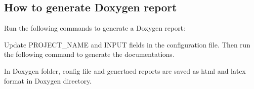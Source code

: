 \subsection*{How to generate Doxygen report}

Run the following commands to generate a Doxygen report\+: 
\begin{DoxyCode}{0}
\end{DoxyCode}
 Update P\+R\+O\+J\+E\+C\+T\+\_\+\+N\+A\+ME and I\+N\+P\+UT fields in the configuration file. Then run the following command to generate the documentations. 
\begin{DoxyCode}{0}
\end{DoxyCode}
 In Doxygen folder, config file and genertaed reports are saved as html and latex format in Doxygen directory. 